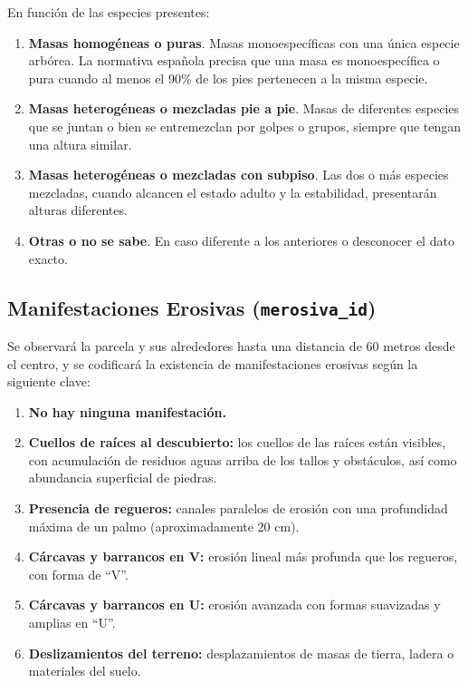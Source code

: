 En función de las especies presentes:

\begin{enumerate}
    \item \textbf{Masas homogéneas o puras}. Masas monoespecíficas con una única especie arbórea. La normativa española precisa que una masa es monoespecífica o pura cuando al menos el 90\% de los pies pertenecen a la misma especie.

    \item \textbf{Masas heterogéneas o mezcladas pie a pie}. Masas de diferentes especies que se juntan o bien se entremezclan por golpes o grupos, siempre que tengan una altura similar.

    \item \textbf{Masas heterogéneas o mezcladas con subpiso}. Las dos o más especies mezcladas, cuando alcancen el estado adulto y la estabilidad, presentarán alturas diferentes.

    \item[9.] \textbf{Otras o no se sabe}. En caso diferente a los anteriores o desconocer el dato exacto.
\end{enumerate}


\subsection{Manifestaciones Erosivas (\texttt{merosiva\_id})}\label{sec:ManERo}

Se observará la parcela y sus alrededores hasta una distancia de 60 metros desde el centro, y se codificará la existencia de manifestaciones erosivas según la siguiente clave:

\begin{enumerate}
    \item \textbf{No hay ninguna manifestación.}

    \item \textbf{Cuellos de raíces al descubierto:} los cuellos de las raíces están visibles, con acumulación de residuos aguas arriba de los tallos y obstáculos, así como abundancia superficial de piedras.

    \item \textbf{Presencia de regueros:} canales paralelos de erosión con una profundidad máxima de un palmo (aproximadamente 20 cm).

    \item \textbf{Cárcavas y barrancos en V:} erosión lineal más profunda que los regueros, con forma de ``V''.

    \item \textbf{Cárcavas y barrancos en U:} erosión avanzada con formas suavizadas y amplias en ``U''.

    \item \textbf{Deslizamientos del terreno:} desplazamientos de masas de tierra, ladera o materiales del suelo.
\end{enumerate}



